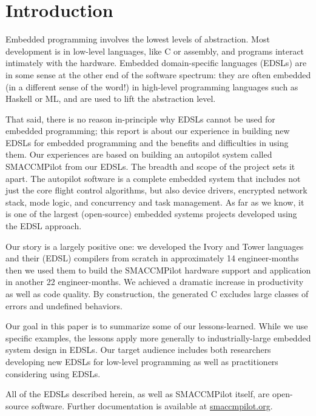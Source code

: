 \section{Introduction}

Embedded programming involves the lowest levels of abstraction.  Most development
is in low-level languages, like C or assembly, and programs interact intimately
with the hardware.  Embedded domain-specific languages (EDSLs) are in
some sense at the other end of the software spectrum: they are often embedded
(in a different sense of the word!) in high-level programming languages such as
Haskell or ML, and are used to lift the abstraction level.

That said, there is no reason in-principle why EDSLs cannot be used for embedded
programming; this report is about our experience in building new EDSLs for
embedded programming and the benefits and difficulties in using them.  Our
experiences are based on building an autopilot system called SMACCMPilot from
our EDSLs.  The breadth and scope of the project sets it apart.  The autopilot
software is a complete embedded system that
includes not just the core flight control algorithms, but also device drivers,
encrypted network stack, mode logic, and concurrency and task management.
As far as we know, it is
one of the largest (open-source) embedded systems projects developed using the
EDSL approach.

Our story is a largely positive one: we developed the Ivory and Tower languages
and their (EDSL) compilers from scratch in approximately 14 engineer-months then
we used them to build the SMACCMPilot hardware support and application in
another 22 engineer-months.  We achieved a dramatic increase in productivity as
well as code quality.  By construction, the generated C excludes large classes
of errors and undefined behaviors.

Our goal in this paper is to summarize some of our lessons-learned.  While we
use specific examples, the lessons apply more generally to industrially-large
embedded system design in EDSLs.  Our target audience includes both researchers
developing new EDSLs for low-level programming as well as practitioners
considering using EDSLs.

All of the EDSLs described herein, as well as SMACCMPilot itself, are
open-source software. Further documentation is available at \url{smaccmpilot.org}.




